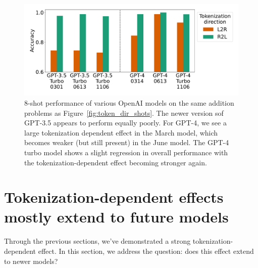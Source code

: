 \documentclass{article}
\theoremstyle{plain}
\theoremstyle{definition}
\theoremstyle{remark}
\begin{document}
\begin{figure}
    \centering
    \includegraphics[width=\columnwidth]{figures/accuracy_diff_tokenization_new_models_v2.pdf}
    \vspace{-2em}
    \caption{8-shot performance of various OpenAI models on the same addition problems as Figure~\ref{fig:token_dir_shots}. The newer version sof GPT-3.5 appears to perform equally poorly. For GPT-4, we see a large tokenization dependent effect in the March model, which becomes weaker (but still present) in the June model. The GPT-4 turbo model shows a slight regression in overall performance with the tokenization-dependent effect becoming stronger again.}
    \vspace{-1em}
    \label{fig:main_effect_new_models}
\end{figure}

\section{Tokenization-dependent effects mostly extend to future models}
\label{sec:later_models}

Through the previous sections, we've demonstrated a strong tokenization-dependent effect. In this section, we address the question: does this effect extend to newer models?
\end{document}
